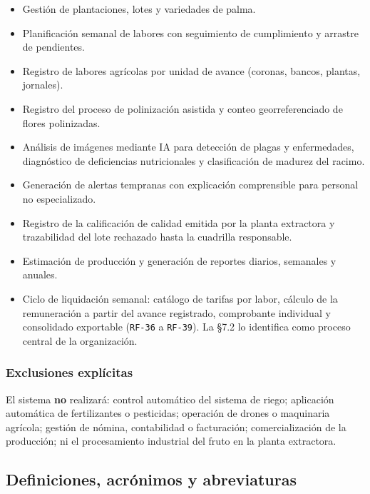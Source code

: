 \documentclass[11pt,a4paper]{article}
\newcommand{\id}[1]{\texttt{\begingroup\hyphenpenalty=10000\relax#1\endgroup}}
\renewcommand{\id}[1]{\texttt{#1}}
\begin{document}
\begin{itemize}[nosep]
  \item Gestión de plantaciones, lotes y variedades de palma.
  \item Planificación semanal de labores con seguimiento de cumplimiento y arrastre de pendientes.
  \item Registro de labores agrícolas por unidad de avance (coronas, bancos, plantas, jornales).
  \item Registro del proceso de polinización asistida y conteo georreferenciado de flores polinizadas.
  \item Análisis de imágenes mediante IA para detección de plagas y enfermedades, diagnóstico de
        deficiencias nutricionales y clasificación de madurez del racimo.
  \item Generación de alertas tempranas con explicación comprensible para personal no especializado.
  \item Registro de la calificación de calidad emitida por la planta extractora y trazabilidad
        del lote rechazado hasta la cuadrilla responsable.
  \item Estimación de producción y generación de reportes diarios, semanales y anuales.
  \item Ciclo de liquidación semanal: catálogo de tarifas por labor, cálculo de la remuneración a
        partir del avance registrado, comprobante individual y consolidado exportable (\id{RF-36} a
        \id{RF-39}). La §7.2 lo identifica como proceso central de la organización.
\end{itemize}

\subsubsection{Exclusiones explícitas}

El sistema \textbf{no} realizará: control automático del sistema de riego; aplicación automática de
fertilizantes o pesticidas; operación de drones o maquinaria agrícola; gestión de nómina, contabilidad
o facturación; comercialización de la producción; ni el procesamiento industrial del fruto en la
planta extractora.

\subsection{Definiciones, acrónimos y abreviaturas}
\end{document}
